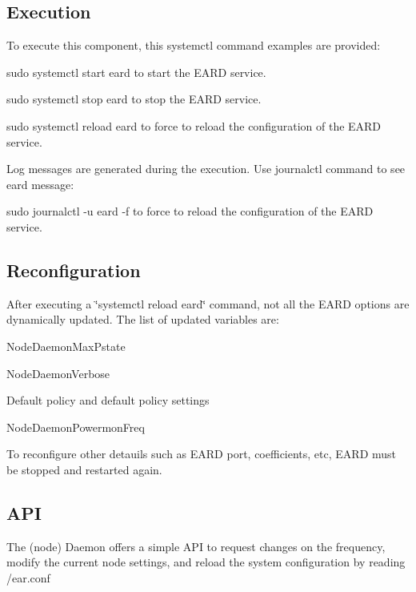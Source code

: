 \subsection*{Execution }

To execute this component, this {\ttfamily systemctl} command examples are provided\+:
\begin{DoxyItemize}
\item {\ttfamily sudo systemctl start eard} to start the E\+A\+RD service.
\item {\ttfamily sudo systemctl stop eard} to stop the E\+A\+RD service.
\item {\ttfamily sudo systemctl reload eard} to force to reload the configuration of the E\+A\+RD service.
\end{DoxyItemize}

Log messages are generated during the execution. Use journalctl command to see eard message\+:


\begin{DoxyItemize}
\item {\ttfamily sudo journalctl -\/u eard -\/f} to force to reload the configuration of the E\+A\+RD service.
\end{DoxyItemize}

\subsection*{Reconfiguration }

After executing a \char`\"{}systemctl reload eard\char`\"{} command, not all the E\+A\+RD options are dynamically updated. The list of updated variables are\+:


\begin{DoxyItemize}
\item Node\+Daemon\+Max\+Pstate
\item Node\+Daemon\+Verbose
\item Default policy and default policy settings
\item Node\+Daemon\+Powermon\+Freq
\end{DoxyItemize}

To reconfigure other detauils such as E\+A\+RD port, coefficients, etc, E\+A\+RD must be stopped and restarted again.

\subsection*{A\+PI }

The (node) Daemon offers a simple A\+PI to request changes on the frequency, modify the current node settings, and reload the system configuration by reading {\ttfamily /ear.conf}

